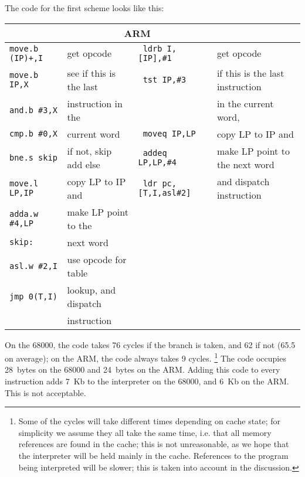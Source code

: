 \documentclass{article}
\newenvironment{code}%
{\begin{small}\begin{tabular}{>{\tt}ll>{\tt}ll}\toprule%
\multicolumn{2}{c}{\bf 68000} & \multicolumn{2}{c}{\bf ARM} \\%
\midrule}%
{\bottomrule\end{tabular}\end{small}}
\begin{document}
The code for the first scheme looks like this:

\begin{center}
\begin{code}

move.b (IP)+,I & get opcode & ldrb I,{[}IP{]},\#1 & get opcode\\

move.b IP,X & see if this is the last & tst IP,\#3 & if this is the last instruction\\

and.b \#3,X & instruction in the & & in the current word,\\

cmp.b \#0,X & current word & moveq IP,LP & copy LP to IP and\\

bne.s skip & if not, skip add else & addeq LP,LP,\#4 & make LP point to the next
word\\

move.l LP,IP & copy LP to IP and & ldr pc,{[}T,I,asl\#2{]} & and dispatch instruction\\

adda.w \#4,LP & make LP point to the &&\\

skip: & next word &&\\

asl.w \#2,I & use opcode for table &&\\

jmp 0(T,I) & lookup, and dispatch &&\\

& instruction &&\\

\end{code}
\end{center}
\noindent On the 68000, the code takes 76 cycles if the branch is taken, and 62
if not (65.5 on average); on the ARM, the code always takes 9 cycles.%
\footnote{Some of the cycles will take different times depending on cache state; for simplicity
we assume they all take the same time, i.e. that all memory references are found
in the cache; this is not unreasonable, as we hope that the interpreter will be
held mainly in the cache. References to the program being interpreted will be
slower; this is taken into account in the discussion.
} The code occupies 28~bytes on the 68000 and 24~bytes on the ARM. Adding this
code to every instruction adds 7~Kb to the interpreter on the 68000, and 6~Kb
on the ARM. This is not acceptable.
\end{document}
